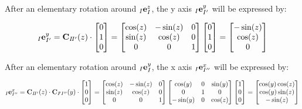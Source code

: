 \documentclass[10pt,landscape,a4paper]{article}
\newcommand\comat[2]{\vC_{#1\!#2}}
\begin{document}
\begin{multicols}{2}
After an elementary rotation around ${}_I \mathbf e^z_I$, the y axis ${}_I \mathbf e^y_{I'}$ will be expressed by:

\begin{equation}
{}_I \ve^y_{I'} = 
\comat{I}{I'}(z) 
\cdot
\begin{bmatrix}
0 \\ 1 \\ 0
\end{bmatrix}
=
\begin{bmatrix}
\cos(z) & -\sin(z) & 0 \\ 
\sin(z) &  \cos(z) & 0 \\ 
0 & 0 & 1
\end{bmatrix}
\begin{bmatrix}
0 \\ 1 \\ 0
\end{bmatrix}
=
\begin{bmatrix}
-\sin(z) \\ \cos(z) \\ 0
\end{bmatrix}
\end{equation}

After an elementary rotation around ${}_I \mathbf e^y_{I}$, the x axis ${}_I \mathbf e^x_{I''}$ will be expressed by:

\begin{equation}
{}_I \ve^x_{I''} = 
\comat{I}{I'}(z) \cdot \comat{I}{'I''}(y)
\cdot
\begin{bmatrix}
1 \\ 0 \\ 0
\end{bmatrix}
=
\begin{bmatrix}
\cos(z) & -\sin(z) 	& 0 \\ 
\sin(z) &  \cos(z) 	& 0 \\ 
0	 	& 0 		& 1
\end{bmatrix}
\begin{bmatrix}
\cos(y) 	& 	0 	& \sin(y)	\\ 
0 			&  	1 	& 0 		\\ 
-\sin(y) 	& 	0 	& \cos(z)
\end{bmatrix}
\begin{bmatrix}
1 \\ 0 \\ 0
\end{bmatrix}
=
\begin{bmatrix}
\cos(y)\cos(z) \\ \cos(y)\sin(z) \\ -\sin(z)
\end{bmatrix}
\end{equation}


\end{multicols}
\end{document}
